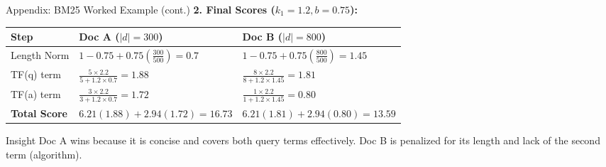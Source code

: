 \documentclass[aspectratio=169]{beamer}
\begin{document}
\begin{frame}[shrink=10]{Appendix: BM25 Worked Example (cont.)}
\textbf{2. Final Scores ($k_1=1.2, b=0.75$):}

\vspace{1em}

\begin{table}
\centering
\small
\begin{tabular}{lll}
\toprule
\textbf{Step} & \textbf{Doc A ($|d|=300$)} & \textbf{Doc B ($|d|=800$)} \\
\midrule
Length Norm & $1 - 0.75 + 0.75(\frac{300}{500}) = \mathbf{0.7}$ & $1 - 0.75 + 0.75(\frac{800}{500}) = \mathbf{1.45}$ \\
\midrule
TF(q) term & $\frac{5 \times 2.2}{5 + 1.2 \times 0.7} = \mathbf{1.88}$ & $\frac{8 \times 2.2}{8 + 1.2 \times 1.45} = \mathbf{1.81}$ \\
\midrule
TF(a) term & $\frac{3 \times 2.2}{3 + 1.2 \times 0.7} = \mathbf{1.72}$ & $\frac{1 \times 2.2}{1 + 1.2 \times 1.45} = \mathbf{0.80}$ \\
\midrule
\textbf{Total Score} & $6.21(1.88) + 2.94(1.72) = \mathbf{16.73}$ & $6.21(1.81) + 2.94(0.80) = \mathbf{13.59}$ \\
\bottomrule
\end{tabular}
\end{table}

\vspace{1em}

\begin{exampleblock}{Insight}
Doc A wins because it is concise and covers both query terms effectively. Doc B is penalized for its length and lack of the second term (algorithm).
\end{exampleblock}
\end{frame}
\end{document}
